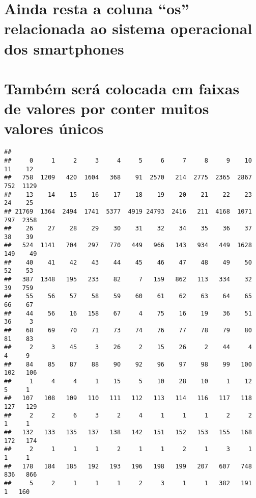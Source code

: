 \documentclass[
]{article}
\newenvironment{Shaded}{\begin{snugshade}}{\end{snugshade}}
\newcommand{\FunctionTok}[1]{\textcolor[rgb]{0.00,0.00,0.00}{#1}}
\newcommand{\NormalTok}[1]{#1}
\newcommand{\OtherTok}[1]{\textcolor[rgb]{0.56,0.35,0.01}{#1}}
\newcommand{\SpecialCharTok}[1]{\textcolor[rgb]{0.00,0.00,0.00}{#1}}
\begin{document}
\hypertarget{ainda-resta-a-coluna-os-relacionada-ao-sistema-operacional-dos-smartphones}{%
\section{Ainda resta a coluna ``os'' relacionada ao sistema operacional
dos
smartphones}\label{ainda-resta-a-coluna-os-relacionada-ao-sistema-operacional-dos-smartphones}}

\hypertarget{tambuxe9m-seruxe1-colocada-em-faixas-de-valores-por-conter-muitos-valores-uxfanicos}{%
\section{Também será colocada em faixas de valores por conter muitos
valores
únicos}\label{tambuxe9m-seruxe1-colocada-em-faixas-de-valores-por-conter-muitos-valores-uxfanicos}}

\begin{Shaded}
\end{Shaded}

\begin{verbatim}
## 
##     0     1     2     3     4     5     6     7     8     9    10    11    12 
##   758  1209   420  1604   368    91  2570   214  2775  2365  2867   752  1129 
##    13    14    15    16    17    18    19    20    21    22    23    24    25 
## 21769  1364  2494  1741  5377  4919 24793  2416   211  4168  1071   797  2358 
##    26    27    28    29    30    31    32    34    35    36    37    38    39 
##   524  1141   704   297   770   449   966   143   934   449  1628   149    49 
##    40    41    42    43    44    45    46    47    48    49    50    52    53 
##   387  1348   195   233    82     7   159   862   113   334    32    39   759 
##    55    56    57    58    59    60    61    62    63    64    65    66    67 
##    44    56    16   158    67     4    75    16    19    36    51    36     3 
##    68    69    70    71    73    74    76    77    78    79    80    81    83 
##     2     3    45     3    26     2    15    26     2    44     4     4     9 
##    84    85    87    88    90    92    96    97    98    99   100   102   106 
##     1     4     4     1    15     5    10    28    10     1    12     5     1 
##   107   108   109   110   111   112   113   114   116   117   118   127   129 
##     2     2     6     3     2     4     1     1     1     2     2     1     1 
##   132   133   135   137   138   142   151   152   153   155   168   172   174 
##     2     1     1     1     2     1     1     2     1     3     1     1     1 
##   178   184   185   192   193   196   198   199   207   607   748   836   866 
##     5     2     1     1     1     2     3     1     1   382   191     1   160
\end{verbatim}
\end{document}
